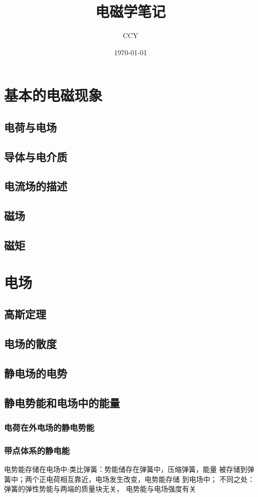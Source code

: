\documentclass[11pt]{ctexart}
\title{电磁学笔记}
\author{CCY}
\date{\today}
\begin{document}
\tableofcontents%
\newpage%
\maketitle
\section{基本的电磁现象}
\subsection{电荷与电场}
\subsection{导体与电介质}
\subsection{电流场的描述}
\subsection{磁场}
\subsection{磁矩}
\newpage
\section{电场}
\subsection{高斯定理}
\subsection{电场的散度}
\subsection{静电场的电势}
\subsection{静电势能和电场中的能量}
\subsubsection{电荷在外电场的静电势能}
\subsubsection{带点体系的静电能}
电势能存储在电场中:类比弹簧：势能储存在弹簧中，压缩弹簧，能量
被存储到弹簧中；两个正电荷相互靠近，电场发生改变，电势能存储
到电场中；      不同之处：弹簧的弹性势能与两端的质量块无关，
电势能与电场强度有关
\end{document}
